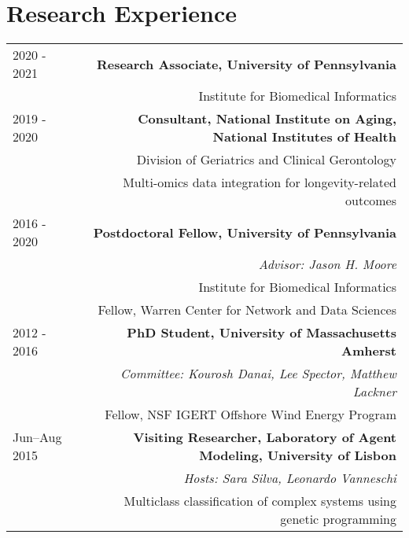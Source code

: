 \section*{Research Experience}

\begin{tabular}{L!{\VRule}R}
2020 - 2021 & {\bf Research Associate,  University of Pennsylvania} \\
& Institute for Biomedical Informatics \\
2019 - 2020  & {\bf Consultant, National Institute on Aging, National Institutes of Health} \\
& Division of Geriatrics and Clinical Gerontology \\
& Multi-omics data integration for longevity-related outcomes\\
2016 - 2020 & {\bf Postdoctoral Fellow, University of Pennsylvania} \\
& {\it Advisor: Jason H. Moore} \\
& Institute for Biomedical Informatics \\
& Fellow, Warren Center for Network and Data Sciences \\
2012 - 2016 & {\bf PhD Student, University of Massachusetts Amherst} \\
& {\it Committee: Kourosh Danai, Lee Spector, Matthew Lackner} \\
& Fellow, NSF IGERT Offshore Wind Energy Program \\
Jun--Aug 2015& {\bf Visiting Researcher, Laboratory of Agent Modeling, University of Lisbon} \\
&{\it Hosts: Sara Silva, Leonardo Vanneschi} \\
& Multiclass classification of complex systems using genetic programming \\

\end{tabular}
